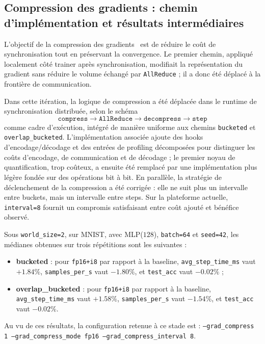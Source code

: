 \documentclass[a4paper,11pt,oneside]{article}
\begin{document}
\subsection{Compression des gradients : chemin d'implémentation et résultats intermédiaires}

L'objectif de la compression des gradients~\cite{alistarh2017qsgd} est de réduire le coût de synchronisation tout en préservant la convergence. Le premier chemin, appliqué localement côté trainer après synchronisation, modifiait la représentation du gradient sans réduire le volume échangé par \texttt{AllReduce} ; il a donc été déplacé à la frontière de communication.

Dans cette itération, la logique de compression a été déplacée dans le runtime de synchronisation distribuée, selon le schéma
\[
\texttt{compress} \rightarrow \texttt{AllReduce} \rightarrow \texttt{decompress} \rightarrow \texttt{step}
\]
comme cadre d'exécution, intégré de manière uniforme aux chemins \texttt{bucketed} et \texttt{overlap\_bucketed}. L'implémentation associée ajoute des hooks d'encodage/décodage et des entrées de profiling décomposées pour distinguer les coûts d'encodage, de communication et de décodage ; le premier noyau de quantification, trop coûteux, a ensuite été remplacé par une implémentation plus légère fondée sur des opérations bit à bit. En parallèle, la stratégie de déclenchement de la compression a été corrigée : elle ne suit plus un intervalle entre buckets, mais un intervalle entre steps. Sur la plateforme actuelle, \texttt{interval=8} fournit un compromis satisfaisant entre coût ajouté et bénéfice observé.

Sous \texttt{world\_size=2}, sur MNIST, avec MLP(\(128\)), \texttt{batch=64} et \texttt{seed=42}, les médianes obtenues sur trois répétitions sont les suivantes :

\begin{itemize}
  \item \textbf{bucketed} : pour \texttt{fp16+i8} par rapport à la baseline,
  \texttt{avg\_step\_time\_ms} vaut \(+1.84\%\),
  \texttt{samples\_per\_s} vaut \(-1.80\%\),
  et \texttt{test\_acc} vaut \(-0.02\%\) ;
  \item \textbf{overlap\_bucketed} : pour \texttt{fp16+i8} par rapport à la baseline,
  \texttt{avg\_step\_time\_ms} vaut \(+1.58\%\),
  \texttt{samples\_per\_s} vaut \(-1.54\%\),
  et \texttt{test\_acc} vaut \(-0.02\%\).
\end{itemize}

Au vu de ces résultats, la configuration retenue à ce stade est :
\texttt{--grad\_compress 1 --grad\_compress\_mode fp16 --grad\_compress\_interval 8}.
\end{document}
